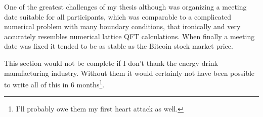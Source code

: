 \documentclass{article}
\theoremstyle{plain} %
\theoremstyle{convention} %
\theoremstyle{remark} %
\numberwithin{equation}{section}
\begin{document}
One of the greatest challenges of my thesis although was organizing a meeting date suitable for all participants, which was comparable to a complicated numerical problem with many boundary conditions, that ironically and very accurately resembles numerical lattice QFT calculations. When finally a meeting date was fixed it tended to be as stable as the Bitcoin stock market price.

This section would not be complete if I don't thank the energy drink manufacturing industry. Without them it would certainly not have been possible to write all of this in \num{6} months\footnote{I'll probably owe them my first heart attack as well.}.


\newpage




\newpage
\end{document}
